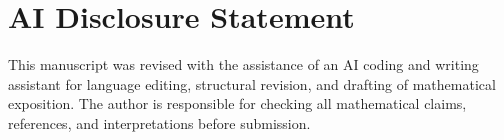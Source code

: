 \documentclass{article}
\theoremstyle{plain}
\theoremstyle{definition}
\begin{document}
\section*{AI Disclosure Statement}

This manuscript was revised with the assistance of an AI coding and writing assistant for language editing, structural revision, and drafting of mathematical exposition. The author is responsible for checking all mathematical claims, references, and interpretations before submission.




\end{document}
